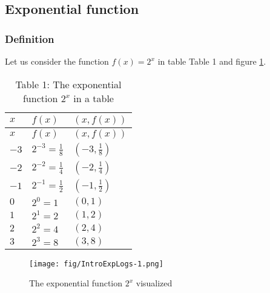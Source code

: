 
\subsection{Exponential function}\label{exponential-function}
\subsubsection{Definition}\label{definition}

Let us consider the function \(f(x) = 2^{x}\) in table Table 1 and figure \ref{fig:IntroExpLogs-1}.

\begin{longtable}[]{@{}lll@{}}
\caption{Table 1: The exponential function \(2^{x}\) in a table}\tabularnewline
\toprule\noalign{}
\(x\) & \(f(x)\) & \((x,f(x))\) \\
\midrule\noalign{}
\endfirsthead
\toprule\noalign{}
\(x\) & \(f(x)\) & \((x,f(x))\) \\
\midrule\noalign{}
\endhead
\bottomrule\noalign{}
\endlastfoot
\(-3\) & \(2^{-3} = \frac{1}{8}\) & \((-3, \frac{1}{8})\) \\
\(-2\) & \(2^{-2} = \frac{1}{4}\) & \((-2, \frac{1}{4})\) \\
\(-1\) & \(2^{-1} = \frac{1}{2}\) & \((-1, \frac{1}{2})\) \\
\(0\) & \(2^{0} = 1\) & \((0 ,1)\) \\
\(1\) & \(2^{1} = 2\) & \((1, 2)\) \\
\(2\) & \(2^{2} = 4\) & \((2,4)\) \\
\(3\) & \(2^{3} = 8\) & \((3, 8)\) \\
\end{longtable}

\begin{figure}
\centering
\texttt{[image: fig/IntroExpLogs-1.png]}
\caption{\label{fig:IntroExpLogs-1} The exponential function \(2^{x}\) visualized}
\end{figure}

